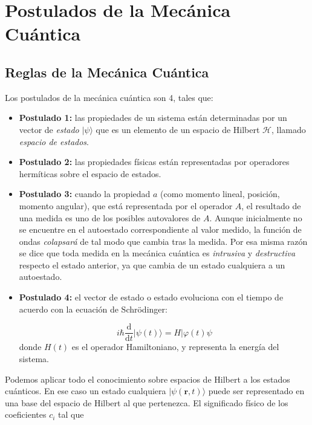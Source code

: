 \documentclass[12pt]{book}
\numberwithin{equation}{chapter}
\numberwithin{figure}{chapter}
\newcommand{\D}{\mathrm{d}}
\newcommand{\derivadas}[2]{\frac{\D #1}{\D #2}}
\newcommand{\rn}{\mathbf{r}}
\begin{document}
\newpage

\chapter{Postulados de la Mecánica Cuántica}

\section{Reglas de la Mecánica Cuántica} \label{Subsec:02.01}

Los postulados de la mecánica cuántica son 4, tales que:

\begin{itemize}
\item \textbf{Postulado 1:} las propiedades de un sistema están determinadas por un vector de \textit{estado} $|\psi \rangle$ que es un elemento de un espacio de Hilbert $\mathcal{H}$, llamado \textit{espacio de estados}. \\
\item \textbf{Postulado 2:} las propiedades físicas están representadas por operadores hermíticas sobre el espacio de estados.  \\
\item \textbf{Postulado 3:} cuando la propiedad $a$ (como momento lineal, posición, momento angular), que está representada por el operador $A$, el resultado de una medida es uno de los posibles autovalores de $A$. Aunque inicialmente no se encuentre en el autoestado correspondiente al valor medido, la función de ondas \textit{colapsará} de tal modo que cambia tras la medida. Por esa misma razón se dice que toda medida en la mecánica cuántica es \textit{intrusiva} y \textit{destructiva} respecto el estado anterior, ya que cambia de un estado cualquiera a un autoestado. 
\item \textbf{Postulado 4:} el vector de estado o estado evoluciona con el tiempo de acuerdo con la ecuación de Schrödinger:

\begin{equation}
i \hbar \derivadas{}{t}  | \psi (t) \rangle  = H | \varphi (t) \psi \label{Ec:02.01-Schrodinger}
\end{equation}
donde $H(t)$ es el operador Hamiltoniano, y representa la energía del sistema. 
\end{itemize}

Podemos aplicar todo el conocimiento sobre espacios de Hilbert a los estados cuánticos. En ese caso un estado cualquiera $| \psi (\rn,t) \rangle$ puede ser representado en una base del espacio de Hilbert al que pertenezca. El significado físico de los coeficientes $c_i$ tal que
\end{document}
